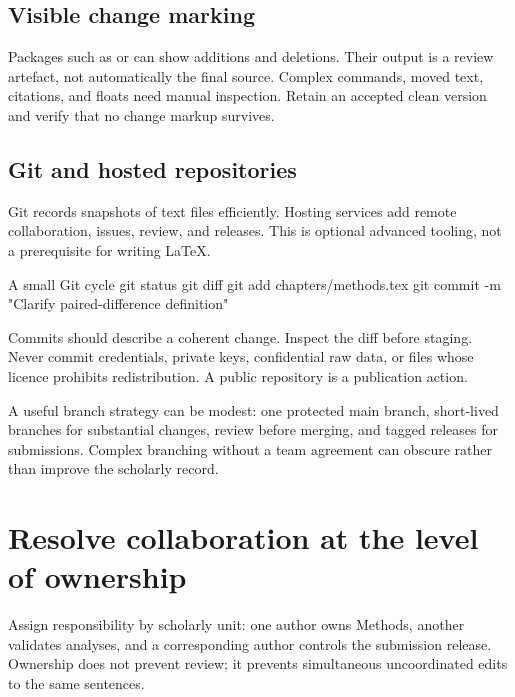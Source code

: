 \subsection{Visible change marking}

Packages such as  or  can show additions and
deletions. Their output is a review artefact, not automatically the final source.
Complex commands, moved text, citations, and floats need manual inspection.
Retain an accepted clean version and verify that no change markup survives.

\subsection{Git and hosted repositories}

Git records snapshots of text files efficiently. Hosting services add remote
collaboration, issues, review, and releases. This is optional advanced tooling,
not a prerequisite for writing \LaTeX{}.

\begin{terminalcode}{A small Git cycle}
git status
git diff
git add chapters/methods.tex
git commit -m "Clarify paired-difference definition"
\end{terminalcode}

Commits should describe a coherent change. Inspect the diff before staging.
Never commit credentials, private keys, confidential raw data, or files whose
licence prohibits redistribution. A public repository is a publication action.

\begin{advancedtopic}
A useful branch strategy can be modest: one protected main branch, short-lived
branches for substantial changes, review before merging, and tagged releases
for submissions. Complex branching without a team agreement can obscure rather
than improve the scholarly record.
\end{advancedtopic}

\section{Resolve collaboration at the level of ownership}

Assign responsibility by scholarly unit: one author owns Methods, another
validates analyses, and a corresponding author controls the submission release.
Ownership does not prevent review; it prevents simultaneous uncoordinated edits
to the same sentences.

